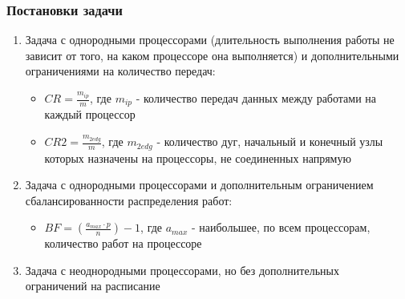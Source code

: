 \begin{frame}
    \frametitle{Постановки задачи}
    \begin{enumerate}
        \item Задача с однородными процессорами (длительность выполнения работы не зависит от того, на каком процессоре она выполняется) и дополнительными ограничениями на количество передач:
              \begin{itemize}
                  \item $CR = \frac{m_{ip}}{m}$, где $m_{ip}$ - количество передач данных между работами на каждый процессор
                        \vspace{5pt}
                  \item $CR2 = \frac{m_{2edg}}{m}$, где $m_{2edg}$ - количество дуг, начальный и конечный узлы которых назначены на процессоры, не соединенных напрямую
              \end{itemize}
        \item Задача с однородными процессорами и дополнительным ограничением сбалансированности распределения работ:
              \begin{itemize}
                  \item $BF = \left( \frac{a_{max} \cdot p}{n} \right) - 1$, где $a_{max}$ - наибольшее, по всем процессорам, количество работ на процессоре
              \end{itemize}
        \item Задача с неоднородными процессорами, но без дополнительных \\ограничений на расписание
    \end{enumerate}
\end{frame}
